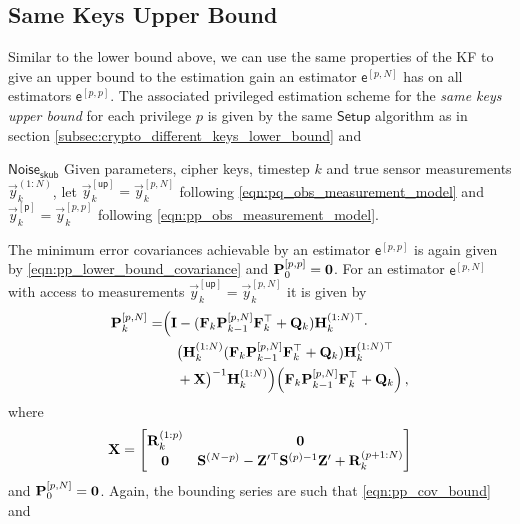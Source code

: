 \documentclass[conference]{IEEEtran}
\theoremstyle{definition}
\theoremstyle{remark}
\begin{document}
\subsection{Same Keys Upper Bound}\label{subsec:crypto_same_keys_upper_bound}
Similar to the lower bound above, we can use the same properties of the KF to give an upper bound to the estimation gain an estimator $\mathsf{e}^{[p,N]}$ has on all estimators $\mathsf{e}^{[p,p]}$. The associated privileged estimation scheme for the \textit{same keys upper bound} for each privilege $p$ is given by the same $\mathsf{Setup}$ algorithm as in section \ref{subsec:crypto_different_keys_lower_bound} and
\begin{LaTeXdescription}
  \item[$\mathsf{Noise}_{\mathsf{skub}}$] Given parameters, cipher keys, timestep $k$ and true sensor measurements $\vec{y}_k^{(1:N)}$, let $\vec{y}_k^{[\mathsf{up}]}=\vec{y}_k^{[p,N]}$ following \eqref{eqn:pq_obs_measurement_model} and $\vec{y}_k^{[\mathsf{p}]}=\vec{y}_k^{[p,p]}$ following \eqref{eqn:pp_obs_measurement_model}.
\end{LaTeXdescription}
The minimum error covariances achievable by an estimator $\mathsf{e}^{[p,p]}$ is again given by \eqref{eqn:pp_lower_bound_covariance} and ${{\mathbf{P}}}_0^{[p,p]} = {{\mathbf{0}}}$. For an estimator $\mathsf{e}^{[p,N]}$ with access to measurements $\vec{y}_k^{[\mathsf{up}]}=\vec{y}_k^{[p,N]}$ it is given by
\begin{equation}\label{eqn:pN_lower_bound_covariance}
  \begin{split}
    \mat{P}_k^{[p,N]} =& \Bigl( \mat{I} - (\mat{F}_k\mat{P}_{k-1}^{[p,N]}\mat{F}_k^\top + \mat{Q}_k)\mat{H}_k^{(1:N)\top} \cdot \\
    &\quad\bigl(\mat{H}_k^{(1:N)}(\mat{F}_k\mat{P}_{k-1}^{[p,N]}\mat{F}_k^\top + \mat{Q}_k)\mat{H}_k^{(1:N)\top} \\
    &\quad+ \mat{X}\bigr)^{-1}\mat{H}_k^{(1:N)}\Bigr)\Bigl(\mat{F}_k\mat{P}_{k-1}^{[p,N]}\mat{F}_k^\top + \mat{Q}_k\Bigr)\,,
 \end{split}
\end{equation}
where
\begin{equation}
  {\ensuremath{{\mathbf{X}}}} = 
  \begin{bmatrix}
    {\ensuremath{{\mathbf{R}}}}_k^{(1:p)} & {{\mathbf{0}}}\\
    {{\mathbf{0}}} & {{\mathbf{S}}}^{(N-p)} - {{\mathbf{Z}}}^{\prime\top}{{\mathbf{S}}}^{(p)-1}{{\mathbf{Z}}}^{\prime} + {{\mathbf{R}}}_k^{(p+1:N)}
  \end{bmatrix}
\end{equation}
and ${{\mathbf{P}}}_0^{[p,N]} = {{\mathbf{0}}}$. Again, the bounding series are such that \eqref{eqn:pp_cov_bound} and
\end{document}
